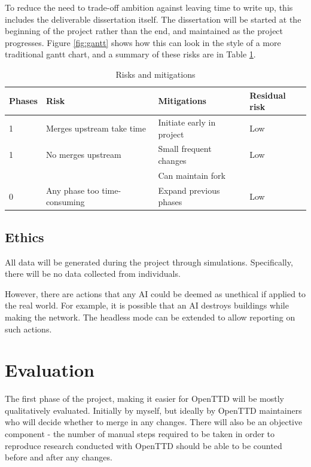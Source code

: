 \documentclass[a4paper,11pt]{article}
\begin{document}
To reduce the need to trade-off ambition against leaving time to write up, this includes the deliverable dissertation itself. The dissertation will be started at the beginning of the project rather than the end, and maintained as the project progresses. Figure \ref{fig:gantt} shows how this can look in the style of a more traditional gantt chart, and a summary of these risks are in Table \ref{fig:risks}.

\begin{table}[htbp]
    \begin{center}
        \begin{tabular}{|l|l|l|l|}
        \hline
        \textbf{Phases} & \textbf{Risk} & \textbf{Mitigations} & \textbf{Residual risk} \\
        \hline
        1 & Merges upstream take time & Initiate early in project & Low \\
        1 & No merges upstream & Small frequent changes & Low \\
          &                    & Can maintain fork & \\
        0 & Any phase too time-consuming & Expand previous phases & Low \\
        \hline
        \end{tabular} 
    \end{center}
    \caption[Project milestones]{Risks and mitigations}
    \label{fig:risks}
\end{table}

\subsection{Ethics}

All data will be generated during the project through simulations. Specifically, there will be no data collected from individuals.

However, there are actions that any AI could be deemed as unethical if applied to the real world. For example, it is possible that an AI destroys buildings while making the network. The headless mode can be extended to allow reporting on such actions.

\section{Evaluation}

The first phase of the project, making it easier for OpenTTD will be mostly qualitatively evaluated. Initially by myself, but ideally by OpenTTD maintainers who will decide whether to merge in any changes. There will also be an objective component - the number of manual steps required to be taken in order to reproduce research conducted with OpenTTD should be able to be counted before and after any changes.
\end{document}
